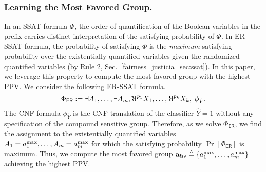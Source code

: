 \subsubsection{Learning the Most Favored Group.}
In an SSAT formula $ \Phi $, the order of quantification of the Boolean variables in the prefix  carries distinct interpretation of the satisfying probability of $ \Phi $.  
In ER-SSAT formula, the probability of satisfying $ \Phi $ is the \textit{maximum} satisfying probability over the existentially quantified variables given the randomized quantified variables (by Rule 2, Sec.~\ref{fairness_justicia_sec:ssat}). 
In this paper, we leverage this property to compute the most favored group with the highest PPV. 
We consider the following ER-SSAT formula. 
\begin{equation}
\Phi_{\mathsf{ER}} := \exists A_1,\dots, \exists A_{\numsensitive},
 \R^{p_{1}}X_1, \dots, \R^{p_{\numnonsensitive}}X_{\numnonsensitive},   \; \phi_{\hat{Y}}.
 \label{fairness_justicia_eq:er}
\end{equation}
The CNF formula $\phi_{\hat{Y}}$ is the CNF translation  of the classifier $ \hat{Y} = 1 $ without any specification of the compound sensitive group.  Therefore, as we solve $ \Phi_{\mathsf{ER}} $, we find the assignment to the existentially quantified variables $ A_1 = a^{\max}_1, \dots,A_{m} = a^{\max}_{m} $ for which the satisfying probability $ \Pr[\Phi_{\mathsf{ER}}] $ is maximum. 
Thus, we compute  the most favored group $ \mathbf{a}_{\mathsf{fav}} \triangleq \{ a^{\max}_1, \dots, a^{\max}_{m} \}$ achieving the highest PPV. 


